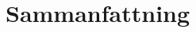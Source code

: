 \documentclass[../report.tex]{subfiles}
\begin{document}
    \chapter{Sammanfattning}
    
\end{document}
